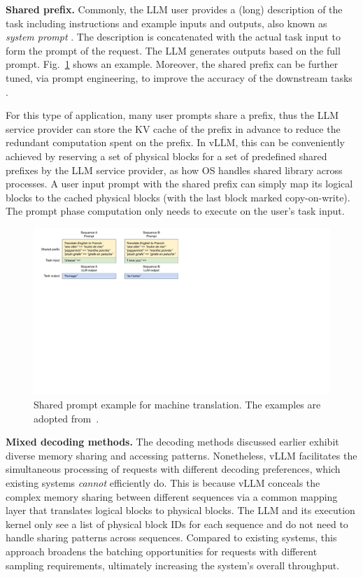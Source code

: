 \documentclass[sigplan,10pt]{acmart}
\newcommand{\sys}[0]{vLLM\xspace}
\newcommand{\heading}[1]{\vspace{4pt}\noindent\textbf{#1}}
\begin{document}
\heading{Shared prefix.} 
Commonly, the LLM user provides a (long) description of the task including instructions and example inputs and outputs, also known as \emph{system prompt} \cite{chatgptuserprompt}.
The description is concatenated with the actual task input to form the prompt of the request. The LLM generates outputs based on the full prompt. Fig.~\ref{fig:share-prompt} shows an example. Moreover, the shared prefix can be further tuned, via prompt engineering, to improve the accuracy of the downstream tasks \cite{li2021prefix, lester2021power}.

For this type of application, many user prompts share a prefix, thus the LLM service provider can store the KV cache of the prefix in advance to reduce the redundant computation spent on the prefix. In \sys, this can be conveniently achieved by reserving a set of physical blocks for a set of predefined shared prefixes by the LLM service provider, as how OS handles shared library across processes. A user input prompt with the shared prefix can simply map its logical blocks to the cached physical blocks (with the last block marked copy-on-write). The prompt phase computation only needs to execute on the user's task input.

\begin{figure}
    \centering
    \includegraphics[width=.9\columnwidth]{figures/share-prompt.pdf}
    \vspace{-5pt}
    \caption{Shared prompt example for machine translation. The examples are adopted from~\cite{brown2020language}.}
    \label{fig:share-prompt}
    \vspace{-15pt}
\end{figure}


\heading{Mixed decoding methods.} 
The decoding methods discussed earlier exhibit diverse memory sharing and accessing patterns. Nonetheless, \sys facilitates the simultaneous processing of requests with different decoding preferences, which existing systems \emph{cannot} efficiently do.
This is because \sys conceals the complex memory sharing between different sequences via a common mapping layer that translates logical blocks to physical blocks. The LLM and its execution kernel only see a list of physical block IDs for each sequence and do not need to handle sharing patterns across sequences. Compared to existing systems, this approach broadens the batching opportunities for requests with different sampling requirements, ultimately increasing the system's overall throughput.
\end{document}

